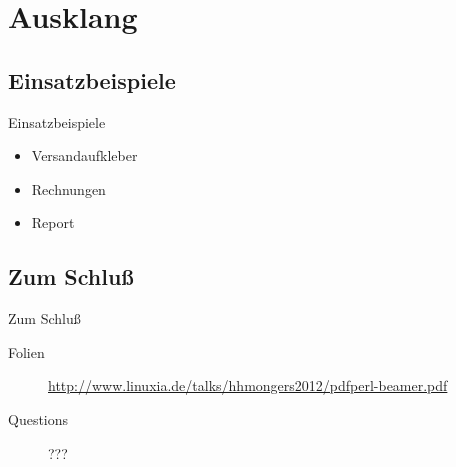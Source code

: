 \section{Ausklang}

\subsection{Einsatzbeispiele}
\begin{frame}{Einsatzbeispiele}
 \begin{itemize}
  \item Versandaufkleber
  \item Rechnungen
  \item Report
  \end{itemize}
\end{frame}

\subsection{Zum Schluß}
\begin{frame}{Zum Schluß}
 \begin{description}
  \item[Folien]
    \url{http://www.linuxia.de/talks/hhmongers2012/pdfperl-beamer.pdf}
   \item[Questions] ???
 \end{description}
\end{frame}




